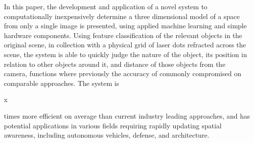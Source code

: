 In this paper, the development and application of a novel system to computationally inexpensively determine a three dimensional model of a space from only a single image is presented, using applied machine learning and simple hardware components. Using feature classification of the relevant objects in the original scene, in collection with a physical grid of laser dots refracted across the scene, the system is able to quickly judge the nature of the object, its position in relation to other objects around it, and distance of those objects from the camera, functions where previously the accuracy of  commonly compromised on comparable approaches. The system is \begin{it}x\end{it} times more efficient on average than current industry leading approaches, and has potential applications in various fields requiring rapidly updating spatial awareness, including autonomous vehicles, defense, and architecture.
